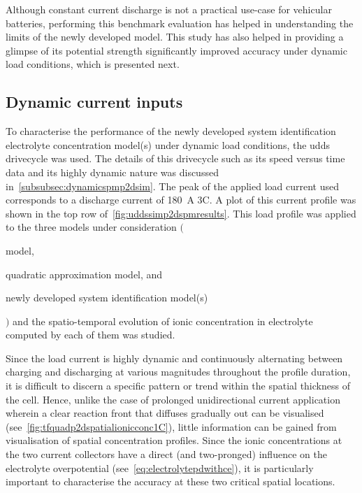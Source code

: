 Although constant  current discharge is  not a practical use-case  for vehicular
batteries, performing this benchmark evaluation  has helped in understanding the
limits of the newly  developed model. This study has also  helped in providing a
glimpse of its  potential strength \viz{} significantly  improved accuracy under
dynamic load conditions, which is presented next.

\subsection{Dynamic current inputs}

To characterise  the performance  of the  newly developed  system identification
electrolyte   concentration  model(s)   under  dynamic   load  conditions,   the
\gls{udds}  drivecycle  was  used.  The  details  of  this  drivecycle  such  as
its  speed  versus  time  data  and its  highly  dynamic  nature  was  discussed
in~\cref{subsubsec:dynamicspmp2dsim}. The peak of  the applied load current used
corresponds to a discharge current of \SI{180}{\ampere} \ie{} 3C. A plot of this
current  profile was  shown in  the top  row of~\cref{fig:uddssimp2dspmresults}.
This  load  profile  was  applied   to  the  three  models  under  consideration
$\big($\begin{enumerate*}[label=\itshape\alph*\upshape)] \item {}
model,  \item   quadratic  approximation   model,  and  \item   newly  developed
system identification  model(s) \end{enumerate*}$\big)$
and the spatio-temporal evolution of ionic concentration in electrolyte computed
by each of them was studied.

Since  the  load   current  is  highly  dynamic   and  continuously  alternating
between  charging   and  discharging   at  various  magnitudes   throughout  the
profile   duration,   it   is   difficult  to   discern   a   specific   pattern
or   trend  within   the  spatial   thickness   of  the   cell.  Hence,   unlike
the   case   of  prolonged   unidirectional   current   application  wherein   a
clear   reaction  front   that  diffuses   gradually  out   can  be   visualised
(see~\cref{fig:tfquadp2dspatialionicconc1C}), little  information can  be gained
from  visualisation   of  spatial   concentration  profiles.  Since   the  ionic
concentrations at  the two  current collectors have  a direct  (and two-pronged)
influence on the  electrolyte overpotential (see~\cref{eq:electrolytepdwithce}),
it is particularly important to characterise  the accuracy at these two critical
spatial locations.

